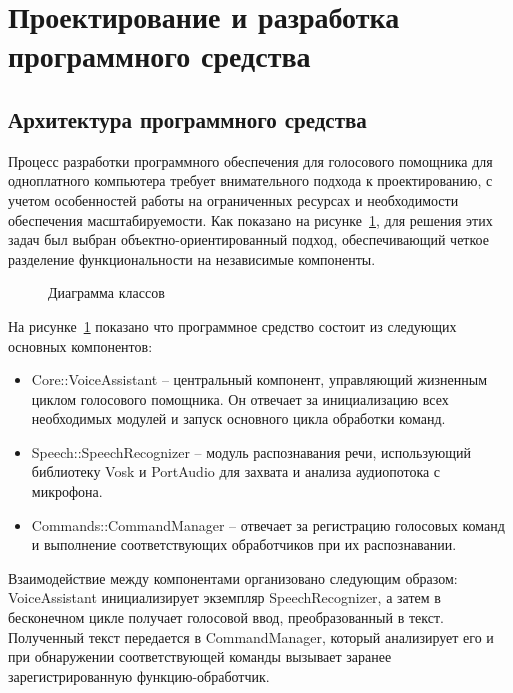 \section{Проектирование и разработка программного средства}

\subsection{Архитектура программного средства}

Процесс разработки программного обеспечения для голосового помощника для одноплатного компьютера требует внимательного подхода к проектированию, с учетом особенностей работы на ограниченных ресурсах и необходимости обеспечения масштабируемости. Как показано на рисунке~\ref{fig:class_diagram}, для решения этих задач был выбран объектно-ориентированный подход, обеспечивающий четкое разделение функциональности на независимые компоненты.

\begin{figure}[H]
	\centering
	\caption{Диаграмма классов}
	\label{fig:class_diagram}
\end{figure}
На рисунке~\ref{fig:class_diagram} показано что программное средство состоит из следующих основных компонентов:

\begin{itemize}
	\item {Core::VoiceAssistant} -- центральный компонент, управляющий жизненным циклом голосового помощника. Он отвечает за инициализацию всех необходимых модулей и запуск основного цикла обработки команд.
	
	\item {Speech::SpeechRecognizer} -- модуль распознавания речи, использующий библиотеку Vosk и PortAudio для захвата и анализа аудиопотока с микрофона.
	
	\item {Commands::CommandManager} -- отвечает за регистрацию голосовых команд и выполнение соответствующих обработчиков при их распознавании.
\end{itemize}

Взаимодействие между компонентами организовано следующим образом: VoiceAssistant инициализирует экземпляр SpeechRecognizer, а затем в бесконечном цикле получает голосовой ввод, преобразованный в текст. Полученный текст передается в CommandManager, который анализирует его и при обнаружении соответствующей команды вызывает заранее зарегистрированную функцию-обработчик.

